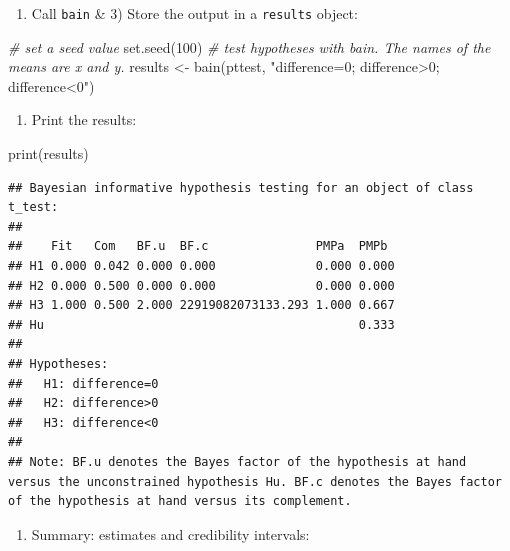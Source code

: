\documentclass[
]{book}
\newenvironment{Shaded}{\begin{snugshade}}{\end{snugshade}}
\newcommand{\CommentTok}[1]{\textcolor[rgb]{0.56,0.35,0.01}{\textit{#1}}}
\newcommand{\DecValTok}[1]{\textcolor[rgb]{0.00,0.00,0.81}{#1}}
\newcommand{\FunctionTok}[1]{\textcolor[rgb]{0.00,0.00,0.00}{#1}}
\newcommand{\NormalTok}[1]{#1}
\newcommand{\OtherTok}[1]{\textcolor[rgb]{0.56,0.35,0.01}{#1}}
\newcommand{\StringTok}[1]{\textcolor[rgb]{0.31,0.60,0.02}{#1}}
\providecommand{\tightlist}{%
  \setlength{\itemsep}{0pt}\setlength{\parskip}{0pt}}
\begin{document}
\begin{enumerate}
\def\labelenumi{\arabic{enumi})}
\setcounter{enumi}{1}
\tightlist
\item
  Call \texttt{bain} \& 3) Store the output in a \texttt{results} object:
\end{enumerate}

\begin{Shaded}
\begin{Highlighting}[]
\CommentTok{\# set a seed value}
\FunctionTok{set.seed}\NormalTok{(}\DecValTok{100}\NormalTok{)}
\CommentTok{\# test hypotheses with bain. The names of the means are x and y.}
\NormalTok{results }\OtherTok{\textless{}{-}} \FunctionTok{bain}\NormalTok{(pttest, }\StringTok{"difference=0; difference\textgreater{}0; difference\textless{}0"}\NormalTok{)}
\end{Highlighting}
\end{Shaded}

\begin{enumerate}
\def\labelenumi{\arabic{enumi})}
\setcounter{enumi}{2}
\tightlist
\item
  Print the results:
\end{enumerate}

\begin{Shaded}
\begin{Highlighting}[]
\FunctionTok{print}\NormalTok{(results)}
\end{Highlighting}
\end{Shaded}

\begin{verbatim}
## Bayesian informative hypothesis testing for an object of class t_test:
## 
##    Fit   Com   BF.u  BF.c               PMPa  PMPb 
## H1 0.000 0.042 0.000 0.000              0.000 0.000
## H2 0.000 0.500 0.000 0.000              0.000 0.000
## H3 1.000 0.500 2.000 22919082073133.293 1.000 0.667
## Hu                                            0.333
## 
## Hypotheses:
##   H1: difference=0
##   H2: difference>0
##   H3: difference<0
## 
## Note: BF.u denotes the Bayes factor of the hypothesis at hand versus the unconstrained hypothesis Hu. BF.c denotes the Bayes factor of the hypothesis at hand versus its complement.
\end{verbatim}

\begin{enumerate}
\def\labelenumi{\arabic{enumi})}
\setcounter{enumi}{3}
\tightlist
\item
  Summary: estimates and credibility intervals:
\end{enumerate}
\end{document}
